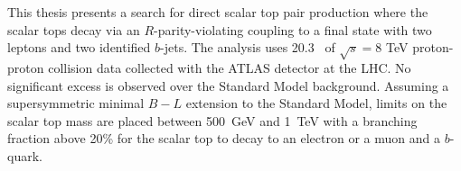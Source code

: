 
This thesis presents a search for direct scalar top pair production where
the scalar tops decay via an $R$-parity-violating coupling to a
final state with two leptons and two identified $b$-jets.
The analysis uses 20.3 \ifb\ of $\sqrt{s} = 8$ TeV proton-proton
collision data collected with the ATLAS detector at the LHC.
No significant excess is observed over the Standard Model background.
Assuming a supersymmetric minimal $B-L$ extension to the Standard Model,
limits on the scalar top mass are placed between 500~GeV and 1~TeV with a
branching fraction above 20\% for the scalar top to decay to an
electron or a muon and a $b$-quark.

